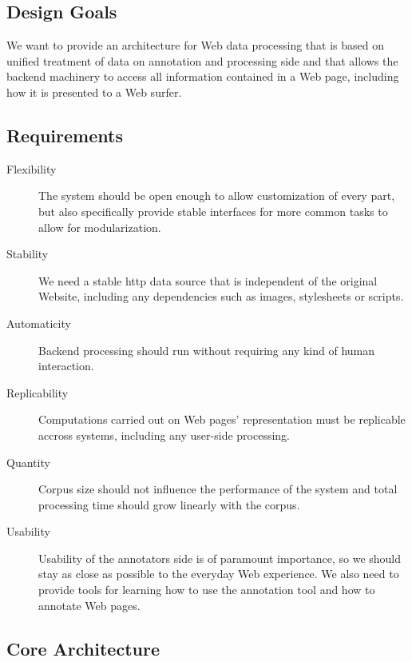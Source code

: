\subsection{Design Goals}

We want to provide an architecture for Web data processing that is based on unified treatment of data on annotation and processing side
and that allows the backend machinery to access all information contained in a Web page, including how it is presented to a Web surfer.

\subsection{Requirements}

\begin{description}

\item[Flexibility]
The system should be open enough to allow customization of every part, but also specifically provide stable interfaces for more common tasks to allow for modularization.

\item[Stability]
We need a stable http data source that is independent of the original Website, including any dependencies such as images, stylesheets or scripts.

\item[Automaticity]
Backend processing should run without requiring any kind of human interaction.

\item[Replicability]
Computations carried out on Web pages' representation must be replicable accross systems, including any user-side processing.

\item[Quantity]
Corpus size should not influence the performance of the system and total processing time should grow linearly with the corpus.

\item[Usability]
Usability of the annotators side is of paramount importance, so we should stay as close as possible to the everyday Web experience.
We also need to provide tools for learning how to use the annotation tool and how to annotate Web pages.

\end{description}

\subsection{Core Architecture}

